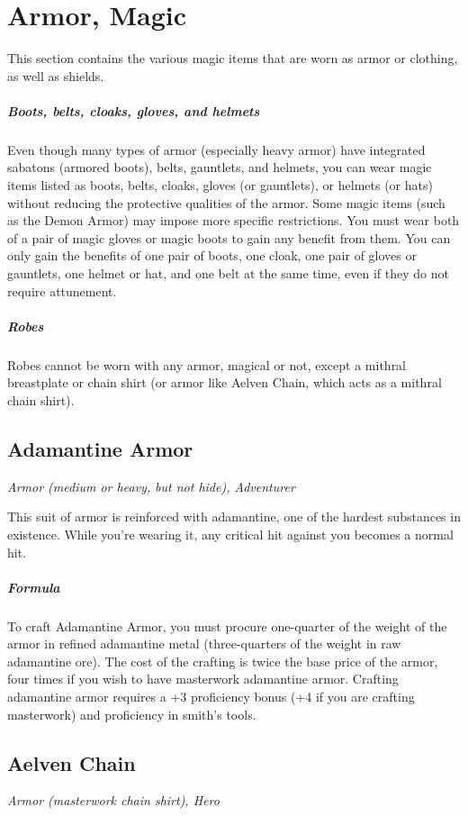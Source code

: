 \section{Armor, Magic}\label{mi:armor}

This section contains the various magic items that are worn as armor or clothing, as well as shields.

\subparagraph*{Boots, belts, cloaks, gloves, and helmets}
Even though many types of armor (especially heavy armor) have integrated sabatons (armored boots), belts, gauntlets, and helmets, you can wear magic items listed as boots, belts, cloaks, gloves (or gauntlets), or helmets (or hats) without reducing the protective qualities of the armor. Some magic items (such as the Demon Armor) may impose more specific restrictions. You must wear both of a pair of magic gloves or magic boots to gain any benefit from them. You can only gain the benefits of one pair of boots, one cloak, one pair of gloves or gauntlets, one helmet or hat, and one belt at the same time, even if they do not require attunement.

\subparagraph*{Robes}
Robes cannot be worn with any armor, magical or not, except a mithral breastplate or chain shirt (or armor like Aelven Chain, which acts as a mithral chain shirt).

\subsection{Adamantine Armor}

\textit{Armor (medium or heavy, but not hide), Adventurer}

This suit of armor is reinforced with adamantine, one of the hardest substances in existence. While you're wearing it, any critical hit against you becomes a normal hit.

\subparagraph*{Formula} To craft Adamantine Armor, you must procure one-quarter of the weight of the armor in refined adamantine metal (three-quarters of the weight in raw adamantine ore). The cost of the crafting is twice the base price of the armor, four times if you wish to have masterwork adamantine armor. Crafting adamantine armor requires a +3 proficiency bonus (+4 if you are crafting masterwork) and proficiency in smith's tools.

\subsection{Aelven Chain}
\textit{Armor (masterwork chain shirt), Hero}

